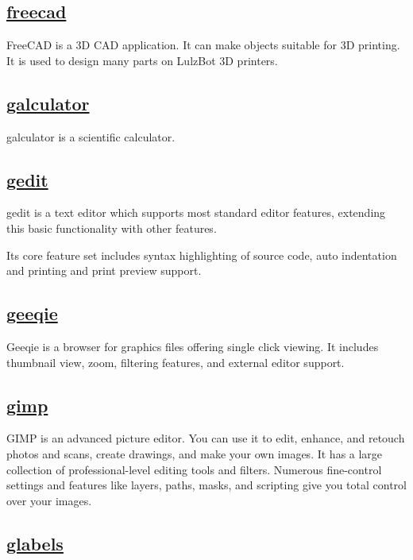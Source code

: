 \subsection{\href{http://freecadweb.org/}{freecad}}

FreeCAD is a 3D CAD application.
It can make objects suitable for 3D printing. It is used to design many
parts on LulzBot 3D printers.

\subsection{\href{http://galculator.sourceforge.net/}{galculator}}

 galculator is a scientific calculator.

\subsection{\href{https://wiki.gnome.org/Apps/Gedit}{gedit}}

 gedit is a text editor which supports most standard editor features,
 extending this basic functionality with other features.
 
 Its core feature set includes syntax
 highlighting of source code, auto indentation and printing and print preview
 support.
 
\subsection{\href{http://geeqie.sourceforge.net/}{geeqie}}

 Geeqie is a browser for graphics files offering single click viewing.
 It includes thumbnail view, zoom, filtering
 features, and external editor support.

\subsection{\href{http://www.gimp.org/}{gimp}}

 GIMP is an advanced picture editor. You can use it to edit, enhance, and
 retouch photos and scans, create drawings, and make your own images.
 It has a large collection of professional-level editing tools and
 filters. Numerous
 fine-control settings and features like layers, paths, masks, and
 scripting give you total control over your images.
 
\subsection{\href{http://glabels.sourceforge.net/}{glabels}}

